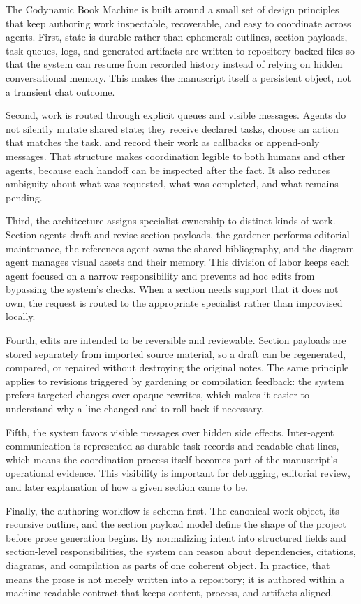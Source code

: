 The Codynamic Book Machine is built around a small set of design principles that keep authoring work inspectable, recoverable, and easy to coordinate across agents. First, state is durable rather than ephemeral: outlines, section payloads, task queues, logs, and generated artifacts are written to repository-backed files so that the system can resume from recorded history instead of relying on hidden conversational memory. This makes the manuscript itself a persistent object, not a transient chat outcome.

Second, work is routed through explicit queues and visible messages. Agents do not silently mutate shared state; they receive declared tasks, choose an action that matches the task, and record their work as callbacks or append-only messages. That structure makes coordination legible to both humans and other agents, because each handoff can be inspected after the fact. It also reduces ambiguity about what was requested, what was completed, and what remains pending.

Third, the architecture assigns specialist ownership to distinct kinds of work. Section agents draft and revise section payloads, the gardener performs editorial maintenance, the references agent owns the shared bibliography, and the diagram agent manages visual assets and their memory. This division of labor keeps each agent focused on a narrow responsibility and prevents ad hoc edits from bypassing the system's checks. When a section needs support that it does not own, the request is routed to the appropriate specialist rather than improvised locally.

Fourth, edits are intended to be reversible and reviewable. Section payloads are stored separately from imported source material, so a draft can be regenerated, compared, or repaired without destroying the original notes. The same principle applies to revisions triggered by gardening or compilation feedback: the system prefers targeted changes over opaque rewrites, which makes it easier to understand why a line changed and to roll back if necessary.

Fifth, the system favors visible messages over hidden side effects. Inter-agent communication is represented as durable task records and readable chat lines, which means the coordination process itself becomes part of the manuscript's operational evidence. This visibility is important for debugging, editorial review, and later explanation of how a given section came to be.

Finally, the authoring workflow is schema-first. The canonical work object, its recursive outline, and the section payload model define the shape of the project before prose generation begins. By normalizing intent into structured fields and section-level responsibilities, the system can reason about dependencies, citations, diagrams, and compilation as parts of one coherent object. In practice, that means the prose is not merely written into a repository; it is authored within a machine-readable contract that keeps content, process, and artifacts aligned.

